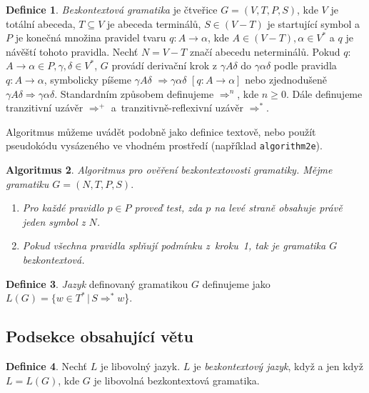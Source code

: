 \documentclass[a4paper, 11pt, twocolumn, czech]{article}
\theoremstyle{definition}
\newtheorem{definice}{Definice}[section]
\theoremstyle{definition}
\newtheorem{algoritmus}[definice]{Algoritmus}
\theoremstyle{definition}
\theoremstyle{definition}
\begin{document}
\begin{definice}
\label{definice1}
\emph{Bezkontextová gramatika} je čtveřice $G = (V,T,P,S)$, kde $V$ je totální abeceda, $T \subseteq V$ je abeceda terminálů, $S \in (V - T)$ je startující symbol a $P$ je konečná množina pravidel tvaru $q\!: A \rightarrow \alpha$, kde $A \in (V - T), \alpha \in V^*$ a $q$ je návěští tohoto pravidla. Nechť $N = V - T$ značí abecedu neterminálů. Pokud $q\!:$ $A \rightarrow \alpha \in P, \gamma, \delta \in V^*$, $G$ provádí derivační krok z $\gamma A \delta$ do $\gamma \alpha \delta$ podle pravidla $q\!: A \rightarrow \alpha$, symbolicky píšeme $\gamma A \delta$ $\Rightarrow \gamma \alpha \delta$ $[q\!: A \rightarrow \alpha]$ nebo zjednodušeně $\gamma A \delta \Rightarrow \gamma \alpha \delta$. Standardním způsobem definujeme $\Rightarrow ^n$, kde $n \geq 0$. Dále definujeme tranzitivní uzávěr $\Rightarrow ^+$ a~tranzitivně-reflexivní uzávěr $\Rightarrow ^*$.
\end{definice}

Algoritmus můžeme uvádět podobně jako definice tex\-tově, nebo použít pseudokódu vysázeného ve vhodném prostředí (například \texttt{algorithm2e}).

\begin{algoritmus}
\emph{Algoritmus pro ověření bezkontextovosti gramatiky. Mějme gramatiku $G = (N,T,P,S).$}
\begin{enumerate}
\item \label{krok1} \emph{Pro každé pravidlo $p \in P$ proveď test, zda $p$ na levé straně obsahuje právě jeden symbol z $N$.}
\item \label{krok2} \emph{Pokud všechna pravidla splňují podmínku z~kro\-ku~1, tak je gramatika $G$ bezkontextová.}
\end{enumerate}
\end{algoritmus}

\begin{definice}
\emph{Jazyk} definovaný gramatikou $G$ definujeme jako $L(G) = \{w \in T^*\,|\,S \Rightarrow ^* w$\}.
\end{definice}

\subsection{Podsekce obsahující větu}

\begin{definice}
Nechť $L$ je libovolný jazyk. $L$ je \emph{bezkontextový jazyk}, když a jen když $L = L(G)$, kde $G$ je libovolná bezkontextová gramatika.
\end{definice}
\end{document}
